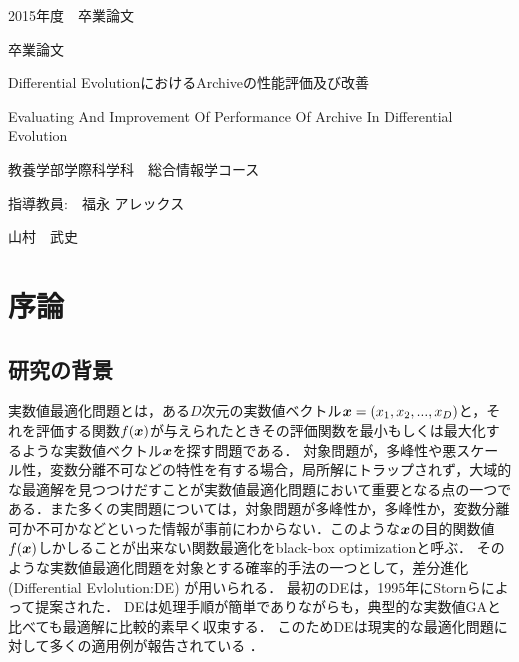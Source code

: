 \documentclass[a4paper,11pt,oneside,openany]{jsbook}
\def\vector#1{\mbox{\boldmath $#1$}}
\begin{document}
\thispagestyle{empty}
2015年度　卒業論文%
\bigskip%
\LARGE%
\begin{center}
卒業論文
\end{center}
\bigskip\bigskip\bigskip\bigskip\bigskip\bigskip\bigskip %
\begin{center} %
Differential EvolutionにおけるArchiveの性能評価及び改善
\end{center}
\large %
\begin{center}
Evaluating And Improvement Of Performance Of Archive In Differential Evolution
\end{center}
\bigskip\bigskip\bigskip\bigskip\bigskip\bigskip\bigskip\bigskip\bigskip\bigskip
\bigskip\bigskip\bigskip\bigskip\bigskip\bigskip\bigskip\bigskip\bigskip
\Large %
\begin{center}
教養学部学際科学科　総合情報学コース
\end{center}
\Large %
\begin{center}
指導教員:　福永 アレックス
\end{center}
\LARGE %
\begin{center}
山村　武史
\end{center}
\normalsize
\thispagestyle{empty}
\tableofcontents

\chapter{序論}
\section{研究の背景}
実数値最適化問題とは，ある$D$次元の実数値ベクトル$\vector{x} = (x_1, x_2, ..., x_D)$と，それを評価する関数$f(\vector{x})$が与えられたときその評価関数を最小もしくは最大化するような実数値ベクトル$\vector{x}$を探す問題である．
対象問題が，多峰性や悪スケール性，変数分離不可などの特性を有する場合，局所解にトラップされず，大域的な最適解を見つつけだすことが実数値最適化問題において重要となる点の一つである．また多くの実問題については，対象問題が多峰性か，多峰性か，変数分離可か不可かなどといった情報が事前にわからない．このような$\vector{x}$の目的関数値$f(\vector{x})$しかしることが出来ない関数最適化をblack-box optimizationと呼ぶ．
そのような実数値最適化問題を対象とする確率的手法の一つとして，差分進化(Differential Evlolution:DE) \cite{Storn} が用いられる．
最初のDEは，1995年にStornらによって提案された．
DEは処理手順が簡単でありながらも，典型的な実数値GAと比べても最適解に比較的素早く収束する． \cite{Storn} \cite{ExDE}
このためDEは現実的な最適化問題に対して多くの適用例が報告されている \cite{ExDE} ．
\end{document}
